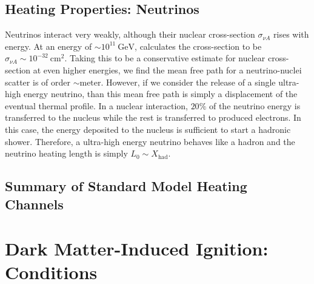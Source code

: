 \documentclass[twocolumn,showpacs,preprintnumbers,amsmath,amssymb,prd]{revtex4}
\newcommand{\GeV}{\text{GeV}}
\newcommand{\cm}{\text{cm}}
\begin{document}
\subsection{Heating Properties: Neutrinos}

Neutrinos interact very weakly, although their nuclear cross-section $\sigma_{\nu A}$ rises with energy.
At an energy of $\sim 10^{11} ~\GeV$, \cite{Formaggio:2013kya} calculates the cross-section to be $\sigma_{\nu A} \sim 10^{-32} ~\cm^2$. 
Taking this to be a conservative estimate for nuclear cross-section at even higher energies, we find the mean free path for a neutrino-nuclei scatter is of order $\sim \text{meter}$. 
However, if we consider the release of a single ultra-high energy neutrino, than this mean free path is simply a displacement of the eventual thermal profile. 
In a nuclear interaction, $20 \%$ of the neutrino energy is transferred to the nucleus while the rest is transferred to produced electrons. 
In this case, the energy deposited to the nucleus is sufficient to start a hadronic shower.
Therefore, a ultra-high energy neutrino behaves like a hadron and the neutrino heating length is simply $L_0 \sim X_\text{had}$.  

\subsection{Summary of Standard Model Heating Channels}

\section{Dark Matter-Induced Ignition: Conditions}
\label{sec:DMexplode}
\end{document}
